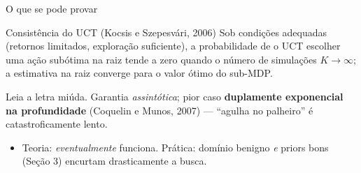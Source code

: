 \documentclass[aspectratio=169, 11pt]{beamer}
\begin{document}
\begin{frame}{O que se pode provar}
  \begin{teobox}{Consistência do UCT (Kocsis e Szepesvári, 2006)}
    Sob condições adequadas (retornos limitados, exploração suficiente), a
    probabilidade de o UCT escolher uma ação subótima na raiz tende a zero
    quando o número de simulações $K \to \infty$; a estimativa na raiz converge
    para o valor ótimo do sub-MDP.
  \end{teobox}

  \pause
  \begin{alertabox}
    Leia a letra miúda. Garantia \emph{assintótica}; pior caso \textbf{duplamente exponencial na profundidade} (Coquelin e Munos, 2007) — ``agulha no palheiro'' é catastroficamente lento.
  \end{alertabox}

  \pause
  \begin{itemize}
    \item Teoria: \emph{eventualmente} funciona. Prática: domínio benigno \emph{e} priors bons (Seção 3) encurtam drasticamente a busca.
  \end{itemize}
\end{frame}
\end{document}
